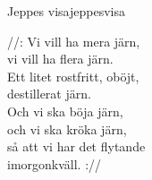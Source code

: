 \begin{song}{Jeppes visa}{jeppesvisa}
\begin{vers}
//: Vi vill ha mera järn,\\
vi vill ha flera järn.\\
Ett litet rostfritt, oböjt,\\
destillerat järn.\\
Och vi ska böja järn,\\
och vi ska kröka järn,\\
så att vi har det flytande\\
imorgonkväll. ://\\
\end{vers}
\end{song}
